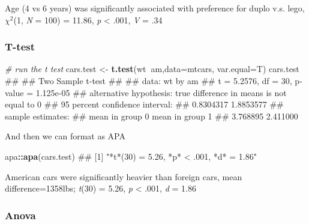 \documentclass[]{article}
\newenvironment{Shaded}{\begin{snugshade}}{\end{snugshade}}
\newcommand{\KeywordTok}[1]{\textcolor[rgb]{0.13,0.29,0.53}{\textbf{#1}}}
\newcommand{\DataTypeTok}[1]{\textcolor[rgb]{0.13,0.29,0.53}{#1}}
\newcommand{\StringTok}[1]{\textcolor[rgb]{0.31,0.60,0.02}{#1}}
\newcommand{\CommentTok}[1]{\textcolor[rgb]{0.56,0.35,0.01}{\textit{#1}}}
\newcommand{\OperatorTok}[1]{\textcolor[rgb]{0.81,0.36,0.00}{\textbf{#1}}}
\newcommand{\NormalTok}[1]{#1}
\theoremstyle{definition}
\theoremstyle{definition}
\theoremstyle{definition}
\theoremstyle{remark}
\begin{document}
{Age (4 vs 6 years) was significantly associated with preference for
duplo v.s. lego, \(\chi^2\)(1, \emph{N} = 100) = 11.86, \emph{p}
\textless{} .001, \emph{V} = .34}

\subsubsection*{T-test}\label{t-test}

\begin{Shaded}
\begin{Highlighting}[]
\CommentTok{# run the t test}
\NormalTok{cars.test <-}\StringTok{ }\KeywordTok{t.test}\NormalTok{(wt}\OperatorTok{~}\NormalTok{am,}\DataTypeTok{data=}\NormalTok{mtcars, }\DataTypeTok{var.equal=}\NormalTok{T)}
\NormalTok{cars.test}
\NormalTok{## }
\NormalTok{##  Two Sample t-test}
\NormalTok{## }
\NormalTok{## data:  wt by am}
\NormalTok{## t = 5.2576, df = 30, p-value = 1.125e-05}
\NormalTok{## alternative hypothesis: true difference in means is not equal to 0}
\NormalTok{## 95 percent confidence interval:}
\NormalTok{##  0.8304317 1.8853577}
\NormalTok{## sample estimates:}
\NormalTok{## mean in group 0 mean in group 1 }
\NormalTok{##        3.768895        2.411000}
\end{Highlighting}
\end{Shaded}

And then we can format as APA

\begin{Shaded}
\begin{Highlighting}[]
\NormalTok{apa}\OperatorTok{::}\KeywordTok{apa}\NormalTok{(cars.test)}
\NormalTok{## [1] "*t*(30) = 5.26, *p* < .001, *d* = 1.86"}
\end{Highlighting}
\end{Shaded}

{American cars were significantly heavier than foreign cars, mean
difference=1358lbs; \emph{t}(30) = 5.26, \emph{p} \textless{} .001,
\emph{d} = 1.86}

\subsubsection*{Anova}\label{anova-1}
\end{document}

